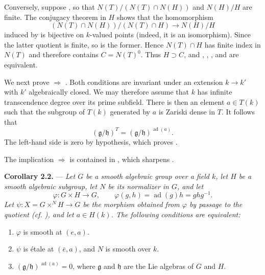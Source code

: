 Conversely, suppose , so that
\(N(T)/(N(T)\cap N(H))\) and \(N(H)/H\) are finite. The conjugacy
theorem in \(H\) shows that the homomorphism
\[
  (N(T)\cap N(H))/(N(T)\cap H)\longrightarrow N(H)/H
\]
induced by  is bijective on \(k\)-valued points
(indeed, it is an isomorphism). Since the latter quotient is finite,
so is the former. Hence \(N(T)\cap H\) has finite index in \(N(T)\)
and therefore contains \(C=N(T)^0\). Thus \(H\supset C\), and ,
, , and  are equivalent.

We next prove  \(\Rightarrow\) . Both conditions are
invariant under an extension \(k\to k'\) with \(k'\) algebraically
closed. We may therefore assume that \(k\) has infinite
transcendence degree over its prime subfield. There is then an
element \(a\in T(k)\) such that the subgroup of \(T(k)\) generated by
\(a\) is Zariski dense in \(T\). It follows that
\[
  (\mathfrak g/\mathfrak h)^T
  =(\mathfrak g/\mathfrak h)^{\operatorname{ad}(a)}.
\]
The left-hand side is zero by hypothesis, which proves .

The implication  \(\Rightarrow\)  is contained in , which sharpens .

\medskip
\noindent{}\textbf{Corollary 2.2.} ---
\textit{Let \(G\) be a smooth algebraic group over a field \(k\), let
\(H\) be a smooth algebraic subgroup, let \(N\) be its normalizer in
\(G\), and let}
\[
  \varphi:G\times H\longrightarrow G,\qquad
  \varphi(g,h)=\operatorname{ad}(g)h=ghg^{-1}.
\]
\textit{Let \(\psi:X=G\times^N H\to G\) be the morphism obtained from
\(\varphi\) by passage to the quotient (cf. ), and let
\(a\in H(k)\). The following conditions are equivalent:}

\begin{enumerate}
\item[(i)] 
  \(\varphi\) is smooth at \((e,a)\).
\item[(ii)] 
  \(\psi\) is étale at \((\bar e,a)\), and \(N\) is smooth over \(k\).
\item[(iii)] 
  \((\mathfrak g/\mathfrak h)^{\operatorname{ad}(a)}=0\), where
  \(\mathfrak g\) and \(\mathfrak h\) are the Lie algebras of \(G\)
  and \(H\).
\end{enumerate}

